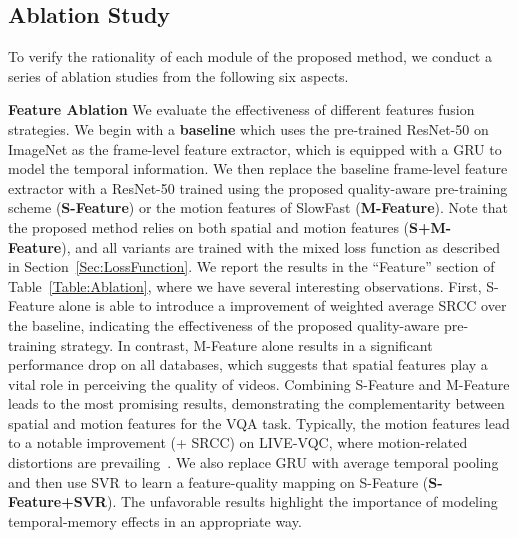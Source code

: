 \documentclass[journal]{IEEEtran}
\begin{document}
{{\subsection{Ablation Study}\label{subsubsec:AblationStudy}
To verify the rationality of each module of the proposed method, we conduct a series of ablation studies from the following six aspects.

\textbf{Feature Ablation} We evaluate the effectiveness of different features fusion strategies. We begin with a {\bf{baseline}} which uses the pre-trained ResNet-50 on ImageNet as the frame-level feature extractor, which is equipped with a GRU to model the temporal information. We then replace the baseline frame-level feature extractor with a ResNet-50 trained using the proposed quality-aware pre-training scheme (\textbf{S-Feature}) or the motion features of SlowFast (\textbf{M-Feature}). Note that the proposed method relies on both spatial and motion features (\textbf{S+M-Feature}), and all variants are trained with the mixed loss function as described in Section~\ref{Sec:LossFunction}. We report the results in the ``Feature'' section of Table~\ref{Table:Ablation}, where we have several interesting observations. First, S-Feature alone is able to introduce a  improvement of weighted average SRCC over the baseline, indicating the effectiveness of the proposed quality-aware pre-training strategy. In contrast, M-Feature alone results in a significant performance drop on all databases, which suggests that spatial features play a vital role in perceiving the quality of videos. Combining S-Feature and M-Feature leads to the most promising results, demonstrating the complementarity between spatial and motion features for the VQA task. Typically, the motion features lead to a notable improvement (+ SRCC) on LIVE-VQC, where motion-related distortions are prevailing~\cite{li2021unified, tu2021rapique}. We also replace GRU with average temporal pooling and then use SVR to learn a feature-quality mapping on S-Feature ({\bf{S-Feature+SVR}}). The unfavorable results highlight the importance of modeling temporal-memory effects in an appropriate way.

}}
\end{document}
